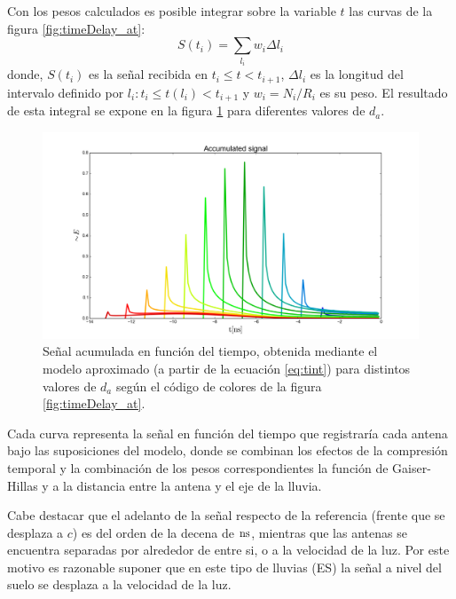 	Con los pesos calculados es posible integrar sobre la variable $t$ las curvas de la figura \ref{fig:timeDelay_at}:
	\begin{equation}
	S(t_i)=\sum_{l_i}w_i\Delta l_i
	\label{eq:tint}
	\end{equation}
	donde, $S(t_i)$ es la señal recibida en $t_i\leq t<t_{i+1}$, $\Delta l_i$ es la longitud del intervalo definido por $l_i:t_i\leq t(l_i)<t_{i+1}$ y $w_i=N_i/R_i$ es su peso.
	El resultado de esta integral se expone en la figura \ref{fig:timeDelay_as} para diferentes valores de $d_a$.
	\begin{figure}[ht!]
		\centering
		\includegraphics[width=\textwidth]{./fig/EASRadio/timeDelay_as}
		\caption{\label{fig:timeDelay_as}
		Se\~nal acumulada en funci\'on del tiempo, obtenida mediante el modelo aproximado (a partir de la ecuación \ref{eq:tint}) para distintos valores de $d_a$ seg\'un el c\'odigo de colores de la figura \ref{fig:timeDelay_at}.
		}
	\end{figure}
	Cada curva representa la se\~nal en funci\'on del tiempo que registrar\'ia cada antena bajo las suposiciones del modelo, donde se combinan los efectos de la compresi\'on temporal y la combinaci\'on de los pesos correspondientes la funci\'on de Gaiser-Hillas y a la distancia entre la antena y el eje de la lluvia.
	
	Cabe destacar que el adelanto de la señal respecto de la referencia (frente que se desplaza a $c$) es del orden de la decena de $\rm ns$, mientras que las antenas se encuentra separadas por alrededor de  entre si, o  a la velocidad de la luz.
	Por este motivo es razonable suponer que en este tipo de lluvias (ES) la señal a nivel del suelo se desplaza a la velocidad de la luz.
	
